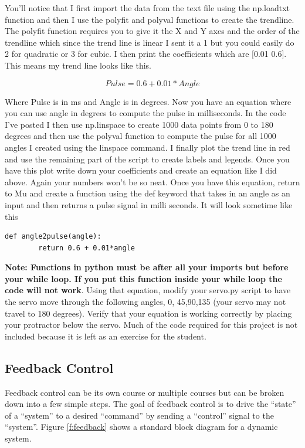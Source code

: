 You’ll notice that I first import the data from the text file using the np.loadtxt function and then I use the polyfit and polyval functions to create the trendline. The polyfit function requires you to give it the X and Y axes and the order of the trendline which since the trend line is linear I sent it a 1 but you could easily do 2 for quadratic or 3 for cubic. I then print the coefficients which are [0.01 0.6]. This means my trend line looks like this.

\begin{equation}
Pulse = 0.6 + 0.01*Angle
\end{equation}

Where Pulse is in ms and Angle is in degrees. Now you have an equation where you can use angle in degrees to compute the pulse in milliseconds. In the code I’ve posted I then use np.linspace to create 1000 data points from 0 to 180 degrees and then use the polyval function to compute the pulse for all 1000 angles I created using the linspace command. I finally plot the trend line in red and use the remaining part of the script to create labels and legends. Once you have this plot write down your coefficients and create an equation like I did above. Again your numbers won’t be so neat. Once you have this equation, return to Mu and create a function using the def keyword that takes in an angle as an input and then returns a pulse signal in milli seconds. It will look sometime like this

\begin{verbatim}
def angle2pulse(angle):
        return 0.6 + 0.01*angle
\end{verbatim}

{\bf Note: Functions in python must be after all your imports but before your while loop. If you put this function inside your while loop the code will not work}. Using that equation, modify your servo.py script to have the servo move through the following angles, 0, 45,90,135 (your servo may not travel to 180 degrees). Verify that your equation is working correctly by placing your protractor below the servo. Much of the code required for this project is not included because it is left as an exercise for the student.

\subsection{Feedback Control}

Feedback control can be its own course or multiple courses but can be
broken down into a few simple steps. The goal of feedback control is
to drive the “state” of a “system” to a desired “command” by sending a
“control” signal to the “system”. Figure \ref{f:feedback} shows a standard block diagram for a dynamic system. 

